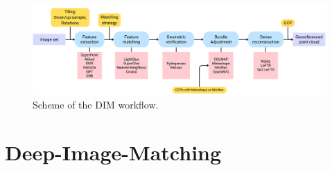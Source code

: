 \begin{figure}[ht]
    \centering
    \includegraphics[width=1\textwidth]{dim_workflow_simple}
    \caption{Scheme of the DIM workflow.}
    \label{fig:5:dim_workflow}
\end{figure}

\section{Deep-Image-Matching}


